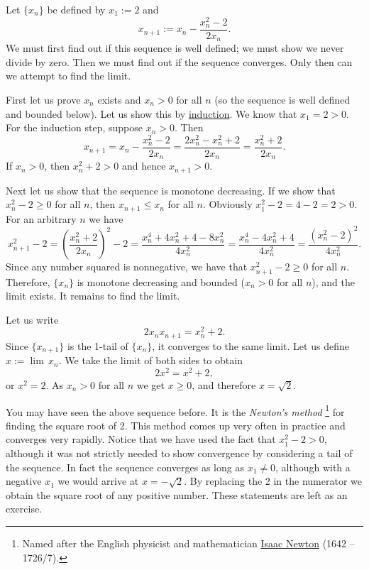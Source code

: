 \documentclass[12pt]{book}
\begin{document}
\begin{example}
Let $\{ x_n \}$ be defined by $x_1 := 2$ and
\begin{equation*}
x_{n+1} := x_n - \frac{x_n^2-2}{2x_n} .
\end{equation*}
We must first find out if this sequence is well defined; we must show we never
divide by zero.
Then we must find out if the sequence converges.
Only then
can we attempt to find the limit.

First let us prove 
$x_n$ exists and $x_n > 0$ for all $n$ (so the sequence is well defined
and bounded below).
Let us show this by \hyperref[induction:thm]{induction}.
We know that
$x_1 = 2 > 0$.
For the induction step, suppose $x_n > 0$.
Then
\begin{equation*}
x_{n+1} = x_n - \frac{x_n^2-2}{2x_n} =
\frac{2x_n^2 - x_n^2+2}{2x_n} =
\frac{x_n^2+2}{2x_n} .
\end{equation*}
If $x_n > 0$, then $x_n^2+2 > 0$ and hence $x_{n+1} > 0$.

Next let us
show that the sequence is monotone decreasing.
If we show that
$x_n^2-2 \geq 0$ for all $n$, then $x_{n+1} \leq x_n$ for all $n$.
Obviously $x_1^2-2 = 4-2 = 2 > 0$.
For an arbitrary $n$ we have 
\begin{equation*}
x_{n+1}^2-2 =
{\left( \frac{x_n^2+2}{2x_n} \right)}^2 - 2
=
\frac{x_n^4+4x_n^2+4 - 8x_n^2}{4x_n^2}
=
\frac{x_n^4-4x_n^2+4}{4x_n^2}
=
\frac{{\left( x_n^2-2 \right)}^2}{4x_n^2} .
\end{equation*}
Since any number squared is nonnegative, we have
that $x_{n+1}^2-2 \geq 0$ for all $n$.
Therefore,
$\{ x_n \}$ is monotone decreasing and bounded ($x_n > 0$ for all $n$), and 
the limit exists.
It remains to find the limit.

Let us write
\begin{equation*}
2x_nx_{n+1} = x_n^2+2 .
\end{equation*}
Since $\{ x_{n+1} \}$ is the 1-tail of $\{ x_n \}$, it converges to the
same limit.
Let us define $x := \lim\, x_n$.
We take the limit of
both sides to obtain
\begin{equation*}
2x^2 = x^2+2 ,
\end{equation*}
or $x^2 = 2$.
As $x_n > 0$ for all $n$ we get $x \geq 0$, and therefore $x = \sqrt{2}$.
\end{example}

You may have seen the above sequence before.
It is the
\emph{Newton's method}%
\footnote{%
Named after the English physicist and mathematician
\href{http://en.wikipedia.org/wiki/Isaac_Newton}{Isaac Newton} (1642 --
1726/7).}
for finding the square root of 2.
This method comes up very often in
practice and converges very rapidly.
Notice that we have used the fact that
$x_1^2 -2 >0$, although it was not strictly needed to show convergence by
considering a tail of the sequence.
In fact the sequence converges as long as $x_1 \not= 0$, although with a negative $x_1$
we would arrive at $x=-\sqrt{2}$.
By replacing the 2 in the numerator we 
obtain the square root of any positive number.
These statements are left as
an exercise.
\end{document}
